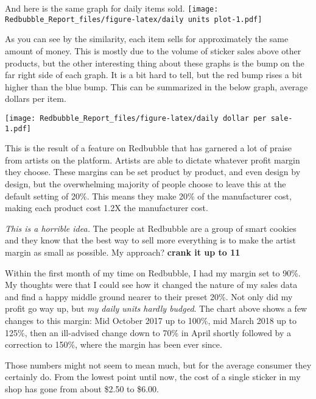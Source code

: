 \documentclass[]{article}
\begin{document}
And here is the same graph for daily items sold.
\texttt{[image: Redbubble\_Report\_files/figure-latex/daily units plot-1.pdf]}

As you can see by the similarity, each item sells for approximately the
same amount of money. This is mostly due to the volume of sticker sales
above other products, but the other interesting thing about these graphs
is the bump on the far right side of each graph. It is a bit hard to
tell, but the red bump rises a bit higher than the blue bump. This can
be summarized in the below graph, average dollars per item.

\texttt{[image: Redbubble\_Report\_files/figure-latex/daily dollar per sale-1.pdf]}

This is the result of a feature on Redbubble that has garnered a lot of
praise from artists on the platform. Artists are able to dictate
whatever profit margin they choose. These margins can be set product by
product, and even design by design, but the overwhelming majority of
people choose to leave this at the default setting of 20\%. This means
they make 20\% of the manufacturer cost, making each product cost 1.2X
the manufacturer cost.

\emph{This is a horrible idea.} The people at Redbubble are a group of
smart cookies and they know that the best way to sell more everything is
to make the artist margin as small as possible. My approach?
\textbf{crank it up to 11}

Within the first month of my time on Redbubble, I had my margin set to
90\%. My thoughts were that I could see how it changed the nature of my
sales data and find a happy middle ground nearer to their preset 20\%.
Not only did my profit go way up, but \emph{my daily units hardly
budged}. The chart above shows a few changes to this margin: Mid October
2017 up to 100\%, mid March 2018 up to 125\%, then an ill-advised change
down to 70\% in April shortly followed by a correction to 150\%, where
the margin has been ever since.

Those numbers might not seem to mean much, but for the average consumer
they certainly do. From the lowest point until now, the cost of a single
sticker in my shop has gone from about \$2.50 to \$6.00.
\end{document}
